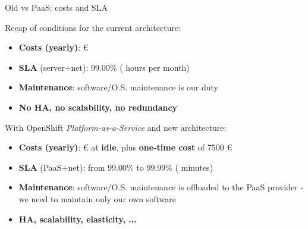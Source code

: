 \begin{frame}{Old vs PaaS: costs and SLA}

Recap of conditions for the current architecture:

\begin{itemize}
  \item \textbf{Costs (yearly)}:  €
  \item \textbf{SLA} (server+net): 99.00\% ( hours per month)
  \item \textbf{Maintenance}: software/O.S. maintenance is our duty
  \item \textbf{No HA, no scalability, no redundancy}
\end{itemize}

With OpenShift \textit{Platform-as-a-Service} and new architecture:

\begin{itemize}
  \item \textbf{Costs (yearly)}:  € at \textbf{idle}, plus
	\textbf{one-time cost} of 7500 €
  \item \textbf{SLA} (PaaS+net): from 99.00\% to 99.99\% ( minutes)
  \item \textbf{Maintenance}: software/O.S. maintenance is offloaded
  to the PaaS provider - we need to maintain only our own software
  \item \textbf{HA, scalability, elasticity, ...}
\end{itemize}

\end{frame}

